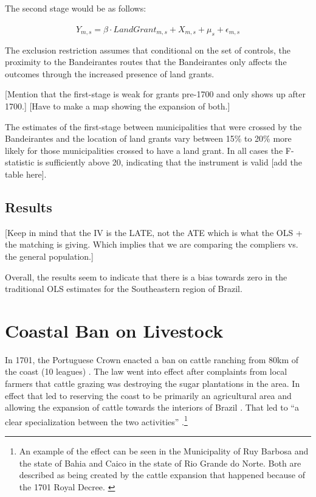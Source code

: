 \documentclass{article}
\begin{document}
The second stage would be as follows:

\begin{equation}
  \label{eqn:ivequation}
  Y_{m,s} = \beta \cdot \widehat{LandGrant}_{m,s} + X_{m,s} + \mu_s +  \epsilon_{m,s}
\end{equation}

The exclusion restriction assumes that conditional on the set of controls, the proximity to the Bandeirantes routes that the Bandeirantes only affects the outcomes through the increased presence of land grants.

[Mention that the first-stage is weak for grants pre-1700 and only shows up after 1700.]
[Have to make a map showing the expansion of both.]

The estimates of the first-stage between municipalities that were crossed by the Bandeirantes and the location of land grants vary between 15\% to 20\% more likely for those municipalities crossed to have a land grant. 
In all cases the F-statistic is sufficiently above 20, indicating that the instrument is valid [add the table here]. 

\subsection{Results}

[Keep in mind that the IV is the LATE, not the ATE which is what the OLS + the matching is giving. Which implies that we are comparing the compliers vs. the general population.]

Overall, the results seem to indicate that there is a bias towards zero in the traditional OLS estimates for the Southeastern region of Brazil. 


\section{Coastal Ban on Livestock}

In 1701, the Portuguese Crown enacted a ban on cattle ranching from 80km of the coast (10 leagues) \parencites[p~.40]{Fausto2014-bh}[p~.198]{Simonsen2005-ps}[p~.460]{Bethell1984-of}. 
The law went into effect after complaints from local farmers that cattle grazing was destroying the sugar plantations in the area. 
In effect that led to reserving the coast to be primarily an agricultural area and allowing the expansion of cattle towards the interiors of Brazil \parencite[p.~216]{Junior1967-jv}.
That led to ``a clear specialization between the two activities'' \parencite{Ribeiro2012-lb}.\footnote{An example of the effect can be seen in the Municipality of Ruy Barbosa and the state of Bahia and Caico in the state of Rio Grande do Norte. Both are described as being created by the cattle expansion that happened because of the 1701 Royal Decree. \parencite{UnknownUnknown-ro}}
\end{document}
